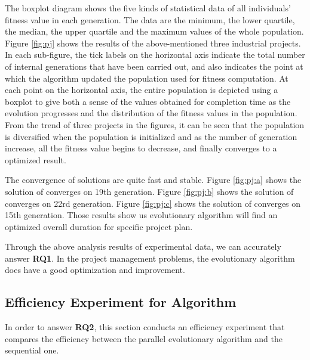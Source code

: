 The boxplot diagram shows the five kinds of statistical data of all individuals'
fitness value in each generation. The data are the minimum, the lower quartile,
the median, the upper quartile and the maximum values of the whole
population. Figure \ref{fig:pj} shows the results of the above-mentioned three
industrial projects. In each sub-figure, the tick labels on the horizontal axis
indicate the total number of internal generations that have been carried out,
and also indicates the point at which the algorithm updated the population used
for fitness computation. At each point on the horizontal axis, the entire
population is depicted using a boxplot to give both a sense of the values
obtained for completion time as the evolution progresses and the distribution of
the fitness values in the population. From the trend of three projects in the
figures, it can be seen that the population is diversified when the population
is initialized and as the number of generation increase, all the fitness value
begins to decrease, and finally converges to a optimized result.

The convergence of solutions are quite fast and stable. Figure \ref{fig:pj:a}
shows the solution of \projectA{} converges on 19th generation. Figure
\ref{fig:pj:b} shows the solution of \projectB{} converges on 22rd generation.
Figure \ref{fig:pj:c} shows the solution of \projectC{} converges on 15th
generation. Those results show us evolutionary algorithm will find an optimized
overall duration for specific project plan.

Through the above analysis results of experimental data, we can accurately
answer \textbf{RQ1}. In the project management problems, the evolutionary
algorithm does have a good optimization and improvement.


\subsection{Efficiency Experiment for Algorithm}
%
In order to answer \textbf{RQ2}, this section conducts an efficiency experiment
that compares the efficiency between the parallel evolutionary algorithm and the
sequential one.


